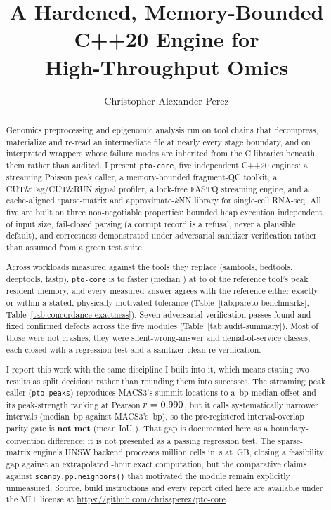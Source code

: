 \documentclass[10pt,twocolumn]{article}
\title{\vspace{-1em}\textbf{A Hardened, Memory-Bounded C++20 Engine for\\
       High-Throughput Omics}}
\author{Christopher Alexander Perez}
\date{}
\begin{document}
\maketitle

\begin{abstract}
\noindent
Genomics preprocessing and epigenomic analysis run on tool chains that
decompress, materialize and re-read an intermediate file at nearly every
stage boundary, and on interpreted wrappers whose failure modes are inherited
from the C libraries beneath them rather than audited. I present
\texttt{pto-core}, five independent C++20 engines: a streaming Poisson peak
caller, a memory-bounded fragment-QC toolkit, a CUT\&Tag/CUT\&RUN signal
profiler, a lock-free FASTQ streaming engine, and a cache-aligned
sparse-matrix and approximate-$k$NN library for single-cell RNA-seq. All five
are built on three non-negotiable properties: bounded heap execution
independent of input size, fail-closed parsing (a corrupt record is a
refusal, never a plausible default), and correctness demonstrated under
adversarial sanitizer verification rather than assumed from a green test
suite.

Across \NumBenchCases{} workloads measured against the tools they replace
(samtools, bedtools, deeptools, fastp), \texttt{pto-core} is
\SpeedupMin{} to \SpeedupMax{} faster (median \SpeedupMedian{}) at
\RssRangeLow{} to \RssRangeHigh{} of the reference tool's peak resident
memory, and every measured answer agrees with the reference either exactly
or within a stated, physically motivated tolerance
(Table~\ref{tab:pareto-benchmarks}, Table~\ref{tab:concordance-exactness}).
Seven adversarial verification passes found and fixed \NumAuditTotal{}
confirmed defects across the five modules (Table~\ref{tab:audit-summary}).
Most of those were not crashes; they were silent-wrong-answer and
denial-of-service classes, each closed with a regression test and a
sanitizer-clean re-verification.

I report this work with the same discipline I built into it, which means
stating two results as split decisions rather than rounding them into
successes. The streaming peak caller (\texttt{pto-peaks}) reproduces MACS3's
summit locations to a \MatchedSummitDist{}\,bp median offset and its
peak-strength ranking at Pearson $r = 0.990{}$, but it calls
systematically narrower intervals (median \PtoMedianWidth{}\,bp against
MACS3's \MacsMedianWidth{}\,bp), so the pre-registered \ParityGate{}
interval-overlap parity gate is \textbf{not met} (mean IoU \MeanIoU{}). That
gap is documented here as a boundary-convention difference; it is not
presented as a passing regression test. The sparse-matrix engine's HNSW
backend processes \ScrnaCells{} million cells in \ScrnaHnswWall{}\,s at
\ScrnaHnswRss{}\,GB, closing a feasibility gap against an extrapolated
\ScrnaExtrapolatedHours{}-hour exact computation, but the comparative claims
against \texttt{scanpy.pp.neighbors()} that motivated the module remain
explicitly unmeasured. Source, build instructions and every report cited here
are available under the MIT license at
\url{https://github.com/chrisaperez/pto-core}.
\end{abstract}
\end{document}
